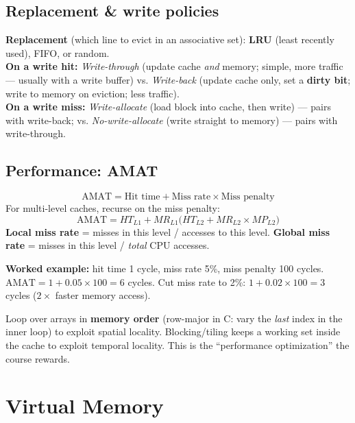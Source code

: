 \documentclass[10pt]{article}
\begin{document}
\subsection{Replacement \& write policies}
\textbf{Replacement} (which line to evict in an associative set): \textbf{LRU} (least recently
used), FIFO, or random.\\
\textbf{On a write hit:} \emph{Write-through} (update cache \emph{and} memory; simple, more
traffic --- usually with a write buffer) vs. \emph{Write-back} (update cache only, set a
\textbf{dirty bit}; write to memory on eviction; less traffic).\\
\textbf{On a write miss:} \emph{Write-allocate} (load block into cache, then write) --- pairs with
write-back; vs. \emph{No-write-allocate} (write straight to memory) --- pairs with write-through.

\subsection{Performance: AMAT}
\begin{formbox}
\[ \text{AMAT} = \text{Hit time} + \text{Miss rate}\times\text{Miss penalty} \]
For multi-level caches, recurse on the miss penalty:
\[ \text{AMAT} = HT_{L1} + MR_{L1}\big(HT_{L2} + MR_{L2}\times MP_{L2}\big) \]
\textbf{Local miss rate} = misses in this level / accesses to this level. \textbf{Global miss
rate} = misses in this level / \emph{total} CPU accesses.
\end{formbox}

\textbf{Worked example:} hit time 1 cycle, miss rate 5\%, miss penalty 100 cycles.
$\text{AMAT}=1+0.05\times100=6$ cycles. Cut miss rate to 2\%: $1+0.02\times100=3$ cycles
($2\times$ faster memory access).

\begin{tipbox}
Loop over arrays in \textbf{memory order} (row-major in C: vary the \emph{last} index in the
inner loop) to exploit spatial locality. Blocking/tiling keeps a working set inside the cache to
exploit temporal locality. This is the ``performance optimization'' the course rewards.
\end{tipbox}

\section{Virtual Memory}
\end{document}
